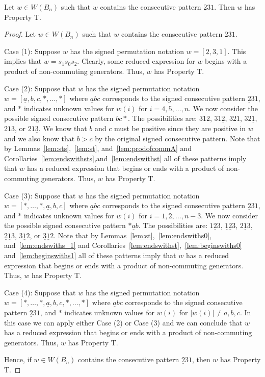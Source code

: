\begin{lemma}\label{lem:231}
Let $w \in W(B_n)$ such that $w$ contains the consecutive pattern $\underline{2}31$. Then $w$ has Property T.
\begin{proof}
	Let $w \in W(B_n)$ such that $w$ contains the consecutive pattern $\underline{2}31$.
	
	Case (1): Suppose $w$ has the signed permutation notation $w=[\underline{2},3,1]$. This implies that $w=s_1s_0s_2$. Clearly, some reduced expression for $w$ begins with a product of non-commuting generators. Thus, $w$ has Property T.
	
	Case (2): Suppose that $w$ has the signed permutation notation $w=[\underline{a},b,c, \ast, \ldots, \ast]$ where $\underline{a}bc$ corresponds to the signed consecutive pattern $\underline{2}31$, and $\ast$ indicates unknown values for $w(i)$ for $i=4,5, \ldots, n$. We now consider the possible signed consecutive pattern $bc \ast$. The possibilities are: $312$, $31\underline{2}$, $321$, $32\underline{1}$, $213$, or $21\underline{3}$. We know that $b$ and $c$ must be positive since they are positive in $w$ and we also know that $b>c$ by the original signed consecutive pattern. Note that by Lemmas~\ref{lem:sts},~\ref{lem:st}, and~\ref{lem:prodofcommA} and Corollaries~\ref{lem:endswithsts},and~\ref{lem:endswithst} all of these patterns imply that $w$ has a reduced expression that begins or ends with a product of non-commuting generators. Thus, $w$ has Property T.
	
	Case (3): Suppose that $w$ has the signed permutation notation $w=[\ast, \ldots, \ast, \underline{a},b,c]$ where $\underline{a}bc$ corresponds to the signed consecutive pattern $\underline{2}31$, and $\ast$ indicates unknown values for $w(i)$ for $i=1,2, \ldots ,n-3$. We now consider the possible signed consecutive pattern $\ast \underline{a}b$. The possibilities are: $1 \underline{2} 3$, $\underline{1} \underline{2}3$, $2 \underline{1} 3$, $\underline{2} \underline{1} 3$, $3 \underline{1} 2$, or $\underline{3} \underline{1} 2$. Note that by Lemmas~\ref{lem:st},~\ref{lem:endswiths0}, and~\ref{lem:endswiths_1} and Corollaries~\ref{lem:endswithst},~\ref{lem:beginswiths0} and~\ref{lem:beginswiths1} all of these patterns imply that $w$ has a reduced expression that begins or ends with a product of non-commuting generators. Thus, $w$ has Property T. 
	
	Case (4): Suppose that $w$ has the signed permutation notation $w=[\ast, \ldots, \ast, \underline{a},b,c, \ast, \ldots, \ast]$ where $\underline{a}bc$ corresponds to the signed consecutive pattern $\underline{2}31$, and $\ast$ indicates unknown values for $w(i)$ for $|w(i)|\neq a,b,c$. In this case we can apply either Case (2) or Case (3) and we can conclude that $w$ has a reduced expression that begins or ends with a product of non-commuting generators. Thus, $w$ has Property T.

	Hence, if $w \in W(B_n)$ contains the consecutive pattern $\underline{2}31$, then $w$ has Property T.
\end{proof}	
\end{lemma}

